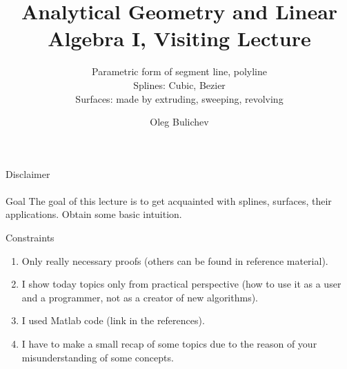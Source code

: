 \documentclass[aspectratio=169]{beamer}
\title[AGLA1]{Analytical Geometry and Linear Algebra I, Visiting Lecture} %
\subtitle{Parametric form of segment line, polyline
\\ Splines: Cubic, Bezier \\ Surfaces: made by extruding, sweeping, revolving 
         } %
\author{Oleg Bulichev}
\newcommand{\fbckg}[1]{\usebackgroundtemplate{\texttt{[image: \#1]}}}%
\begin{document}
\setlength{\abovedisplayskip}{0pt}
\setlength{\belowdisplayskip}{0pt}
\setlength{\abovedisplayshortskip}{0pt}
\setlength{\belowdisplayshortskip}{0pt}

\fbckg{fibeamer/figs/title_page.png}
\note{
    \begin{enumerate}
        \item \ 

    \end{enumerate}
}

\fbckg{fibeamer/figs/common.png}



\begin{frame}[t]{Disclaimer}
\framesubtitle{}
\begin{block}{Goal}
    The goal of this lecture is to get acquainted with splines, surfaces, their applications. Obtain some basic intuition. 
\end{block}
\vspace{-0.2cm}
\begin{alertblock}{Constraints}
    \begin{enumerate}
        \item Only really necessary proofs (others can be found in reference material).
        \item I show today topics only from practical perspective (how to use it as a user and a programmer, not as a creator of new algorithms).
        \item I used Matlab code (link in the references).
        \item I have to make a small recap of some topics due to the reason of your misunderstanding of some concepts. 
    \end{enumerate}
\end{alertblock}
\end{frame}
\end{document}
